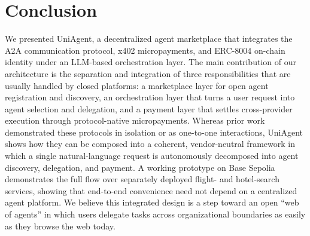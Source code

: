 \documentclass[sigconf]{acmart}
\begin{document}
\section{Conclusion}
\label{sec:conclusion}

We presented UniAgent, a decentralized agent marketplace that integrates
the A2A communication protocol, x402 micropayments, and ERC-8004
on-chain identity under an LLM-based orchestration layer. The main
contribution of our architecture is the separation and integration of
three responsibilities that are usually handled by closed platforms: a
marketplace layer for open agent registration and discovery, an
orchestration layer that turns a user request into agent selection and
delegation, and a payment layer that settles cross-provider execution
through protocol-native micropayments. Whereas prior work demonstrated
these protocols in isolation or as one-to-one interactions, UniAgent
shows how they can be composed into a coherent, vendor-neutral framework
in which a single natural-language request is autonomously decomposed
into agent discovery, delegation, and payment. A working prototype on
Base Sepolia demonstrates the full flow over separately deployed flight-
and hotel-search services, showing that end-to-end convenience need not depend
on a centralized agent platform. We believe this integrated design is a
step toward an open ``web of agents'' in which users delegate tasks
across organizational boundaries as easily as they browse the web today.



\end{document}
